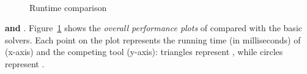 \begin{figure}
~
\caption{Runtime comparison}
\label{fig:toolplot}
\end{figure}

\textbf{\ringenSync{} and \theringenCICI{}}. Figure~\ref{fig:toolplot} shows the \textit{overall performance plots} of \theringenCICI{} compared with the basic solvers. Each point on the plot represents the running time (in milliseconds) of \theringenCICI{} (x-axis) and the competing tool (y-axis): triangles represent \theringen{}, while circles represent \racer{}.
